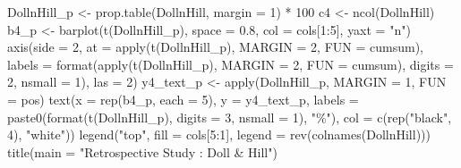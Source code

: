 \documentclass[
]{article}
\newenvironment{Shaded}{\begin{snugshade}}{\end{snugshade}}
\newcommand{\AttributeTok}[1]{\textcolor[rgb]{0.77,0.63,0.00}{#1}}
\newcommand{\DecValTok}[1]{\textcolor[rgb]{0.00,0.00,0.81}{#1}}
\newcommand{\FloatTok}[1]{\textcolor[rgb]{0.00,0.00,0.81}{#1}}
\newcommand{\FunctionTok}[1]{\textcolor[rgb]{0.00,0.00,0.00}{#1}}
\newcommand{\NormalTok}[1]{#1}
\newcommand{\OtherTok}[1]{\textcolor[rgb]{0.56,0.35,0.01}{#1}}
\newcommand{\SpecialCharTok}[1]{\textcolor[rgb]{0.00,0.00,0.00}{#1}}
\newcommand{\StringTok}[1]{\textcolor[rgb]{0.31,0.60,0.02}{#1}}
\begin{document}
\begin{Shaded}
\begin{Highlighting}[]
\NormalTok{DollnHill\_p }\OtherTok{\textless{}{-}} \FunctionTok{prop.table}\NormalTok{(DollnHill, }
                          \AttributeTok{margin =} \DecValTok{1}\NormalTok{) }\SpecialCharTok{*} \DecValTok{100}
\NormalTok{c4 }\OtherTok{\textless{}{-}} \FunctionTok{ncol}\NormalTok{(DollnHill)}
\NormalTok{b4\_p }\OtherTok{\textless{}{-}} \FunctionTok{barplot}\NormalTok{(}\FunctionTok{t}\NormalTok{(DollnHill\_p), }
                \AttributeTok{space =} \FloatTok{0.8}\NormalTok{, }
                \AttributeTok{col =}\NormalTok{ cols[}\DecValTok{1}\SpecialCharTok{:}\DecValTok{5}\NormalTok{], }
                \AttributeTok{yaxt =} \StringTok{"n"}\NormalTok{)}
\FunctionTok{axis}\NormalTok{(}\AttributeTok{side =} \DecValTok{2}\NormalTok{,}
     \AttributeTok{at =} \FunctionTok{apply}\NormalTok{(}\FunctionTok{t}\NormalTok{(DollnHill\_p), }
                \AttributeTok{MARGIN =} \DecValTok{2}\NormalTok{, }
                \AttributeTok{FUN =}\NormalTok{ cumsum),}
     \AttributeTok{labels =} \FunctionTok{format}\NormalTok{(}\FunctionTok{apply}\NormalTok{(}\FunctionTok{t}\NormalTok{(DollnHill\_p), }
                           \AttributeTok{MARGIN =} \DecValTok{2}\NormalTok{, }
                           \AttributeTok{FUN =}\NormalTok{ cumsum), }
                     \AttributeTok{digits =} \DecValTok{2}\NormalTok{, }
                     \AttributeTok{nsmall =} \DecValTok{1}\NormalTok{), }
     \AttributeTok{las =} \DecValTok{2}\NormalTok{)}
\NormalTok{y4\_text\_p }\OtherTok{\textless{}{-}} \FunctionTok{apply}\NormalTok{(DollnHill\_p, }
                   \AttributeTok{MARGIN =} \DecValTok{1}\NormalTok{, }
                   \AttributeTok{FUN =}\NormalTok{ pos)}
\FunctionTok{text}\NormalTok{(}\AttributeTok{x =} \FunctionTok{rep}\NormalTok{(b4\_p, }\AttributeTok{each =} \DecValTok{5}\NormalTok{), }
     \AttributeTok{y =}\NormalTok{ y4\_text\_p, }
     \AttributeTok{labels =} \FunctionTok{paste0}\NormalTok{(}\FunctionTok{format}\NormalTok{(}\FunctionTok{t}\NormalTok{(DollnHill\_p), }
                            \AttributeTok{digits =} \DecValTok{3}\NormalTok{, }
                            \AttributeTok{nsmall =} \DecValTok{1}\NormalTok{), }\StringTok{"\%"}\NormalTok{), }
     \AttributeTok{col =} \FunctionTok{c}\NormalTok{(}\FunctionTok{rep}\NormalTok{(}\StringTok{"black"}\NormalTok{, }\DecValTok{4}\NormalTok{), }\StringTok{"white"}\NormalTok{))}
\FunctionTok{legend}\NormalTok{(}\StringTok{"top"}\NormalTok{, }
       \AttributeTok{fill =}\NormalTok{ cols[}\DecValTok{5}\SpecialCharTok{:}\DecValTok{1}\NormalTok{], }
       \AttributeTok{legend =} \FunctionTok{rev}\NormalTok{(}\FunctionTok{colnames}\NormalTok{(DollnHill)))}
\FunctionTok{title}\NormalTok{(}\AttributeTok{main =} \StringTok{"Retrospective Study : Doll \& Hill"}\NormalTok{)}
\end{Highlighting}
\end{Shaded}
\end{document}
